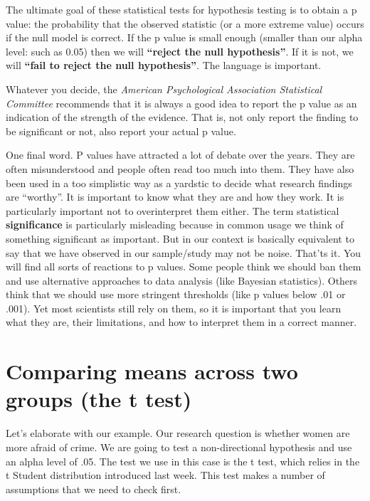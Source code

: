 \documentclass[
]{book}
\begin{document}
The ultimate goal of these statistical tests for hypothesis testing is to obtain a p value: the probability that the observed statistic (or a more extreme value) occurs if the null model is correct. If the p value is small enough (smaller than our alpha level: such as 0.05) then we will \textbf{``reject the null hypothesis''}. If it is not, we will \textbf{``fail to reject the null hypothesis''}. The language is important.

Whatever you decide, the \emph{American Psychological Association Statistical Committee} recommends that it is always a good idea to report the p value as an indication of the strength of the evidence. That is, not only report the finding to be significant or not, also report your actual p value.

One final word. P values have attracted a lot of debate over the years. They are often misunderstood and people often read too much into them. They have also been used in a too simplistic way as a yardstic to decide what research findings are ``worthy''. It is important to know what they are and how they work. It is particularly important not to overinterpret them either. The term statistical \textbf{significance} is particularly misleading because in common usage we think of something significant as important. But in our context is basically equivalent to say that we have observed in our sample/study may not be noise. That'ts it. You will find all sorts of reactions to p values. Some people think we should ban them and use alternative approaches to data analysis (like Bayesian statistics). Others think that we should use more stringent thresholds (like p values below .01 or .001). Yet most scientists still rely on them, so it is important that you learn what they are, their limitations, and how to interpret them in a correct manner.

\hypertarget{comparing-means-across-two-groups-the-t-test}{%
\section{Comparing means across two groups (the t test)}\label{comparing-means-across-two-groups-the-t-test}}

Let's elaborate with our example. Our research question is whether women are more afraid of crime. We are going to test a non-directional hypothesis and use an alpha level of .05. The test we use in this case is the t test, which relies in the t Student distribution introduced last week. This test makes a number of assumptions that we need to check first.
\end{document}
